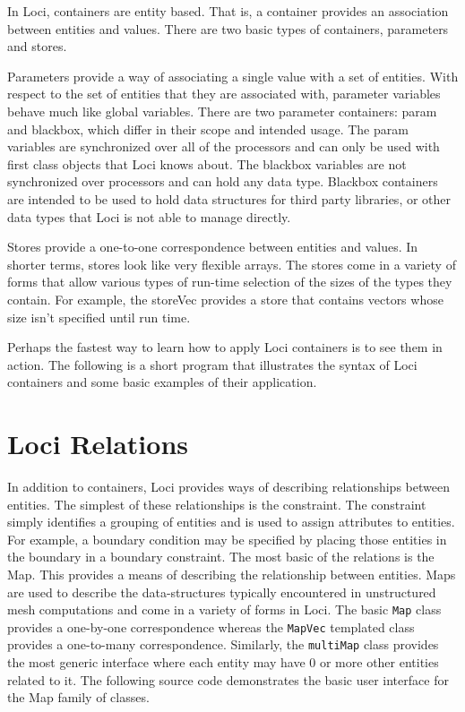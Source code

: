 \documentclass[10pt,epsf]{book}
\begin{document}
In Loci, containers are entity based.  That is, a container provides
an association between entities and values.  There are two basic types
of containers, parameters and stores.

Parameters provide a way of associating a single value with a set of
entities.  With respect to the set of entities that they are associated
with, parameter variables behave much like global variables.  There are
two parameter containers: param and blackbox, which differ in their
scope and intended usage.  The param variables are synchronized over all
of the processors and can only be used with first class objects that Loci
knows about.  The blackbox variables are not synchronized over processors
and can hold any data type.  Blackbox containers are intended to be used
to hold data structures for third party libraries, or other data types
that Loci is not able to manage directly.

Stores provide a one-to-one correspondence between entities and values.
In shorter terms, stores look like very flexible arrays.  The stores
come in a variety of forms that allow various types of run-time selection
of the sizes of the types they contain.  For example, the storeVec
provides a store that contains vectors whose size isn't specified until
run time.

Perhaps the fastest way to learn how to apply Loci containers is to see
them in action.  The following is a short program that illustrates the
syntax of Loci containers and some basic examples of their application.



\section{Loci Relations}
In addition to containers, Loci provides ways of describing
relationships between entities.  The simplest of these relationships
is the constraint.  The constraint simply identifies a grouping of
entities and is used to assign attributes to entities.  For example,
a boundary condition may be specified by placing those entities in the
boundary in a boundary constraint.  The most basic of the relations is
the Map.  This provides a means of describing the relationship between
entities.  Maps are used to describe the data-structures typically
encountered in unstructured mesh computations and come in a variety of
forms in Loci.  The basic {\tt Map} class provides a one-by-one
correspondence whereas the {\tt MapVec} templated class provides a
one-to-many correspondence.  Similarly, the {\tt multiMap} class
provides the most generic interface where each entity may have 0 or
more other entities related to it.  The following source code
demonstrates the basic user interface for the Map family of classes.
\end{document}
